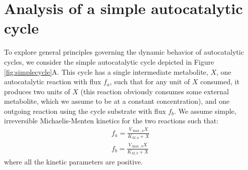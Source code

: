 \documentclass[a4page,notitlepage]{article}
\begin{document}
\section{Analysis of a simple autocatalytic cycle}
To explore general principles governing the dynamic behavior of autocatalytic cycles, we consider the simple autocatalytic cycle depicted in Figure \ref{fig:simplecycle}A.
    This cycle has a single intermediate metabolite, $X$, one autocatalytic reaction with flux $f_a$, such that for any unit of $X$ consumed, it produces two units of $X$ (this reaction obviously consumes some external metabolite, which we assume to be at a constant concentration), and one outgoing reaction using the cycle substrate with flux $f_b$.
    We assume simple, irreversible Michaelis-Menten kinetics for the two reactions such that:
    \begin{eqnarray*}
      f_a = \frac{V_{\max,a}X}{K_{M,a}+X} \\
      f_b = \frac{V_{\max,b}X}{K_{M,b}+X}
    \end{eqnarray*}
    where all the kinetic parameters are positive.
\end{document}
